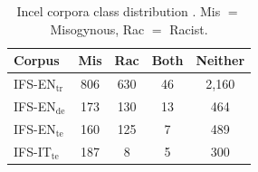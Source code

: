 \documentclass[11pt]{article}
\newcommand{\dsITclassification}{IFS-IT}
\newcommand{\dsENclassificationtrain}{IFS-EN$_{\mbox{tr}}$} %
\newcommand{\dsENclassificationdev}{IFS-EN$_{\mbox{de}}$} %
\newcommand{\dsENclassificationtest}{IFS-EN$_{\mbox{te}}$} %
\begin{document}
\begin{table}[t]
  \caption{Incel corpora class distribution \cite{gajo2023identification}. Mis $=$ Misogynous, Rac $=$ Racist.}
  \label{tab:incel-distribution}
  \centering
  \begin{tabular}{l|cccc}
    \hline
    \bf Corpus                & \bf Mis & \bf Rac & \bf Both & \bf  Neither \\
    \hline
    \dsENclassificationtrain\,	&  806 & 630 & 46 & 
  2,160 \\
    \dsENclassificationdev 	&  173 & 130 & 13 & 464 \\
    \dsENclassificationtest 	&  160 & 125 & 7 & 489 \\
    \dsITclassification$_{\mbox{te}}$  & 187 & 8 & 5 & 300 \\
    \hline
    \end{tabular}
\end{table}
\end{document}
